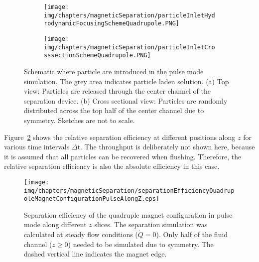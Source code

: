 \begin{figure}[htb]
        \centering
        \begin{subfigure}[b]{0.45\textwidth}
                \texttt{[image: img/chapters/magneticSeparation/particleInletHydrodynamicFocusingSchemeQuadrupole.PNG]}
                \caption{}  
        \end{subfigure}
        \begin{subfigure}[b]{0.45\textwidth}
                \texttt{[image: img/chapters/magneticSeparation/particleInletCrosssectionSchemeQuadrupole.PNG]}
                \caption{}                
        \end{subfigure}
        \caption[Schematic where particle are introduced in the pulse mode simulation]{Schematic where particle are introduced in the pulse mode simulation. The grey area indicates particle laden solution. (a) Top view: Particles are released through the center channel of the separation device. (b) Cross sectional view: Particles are randomly distributed across the top half of the center channel due to symmetry. Sketches are not to scale.}
        \label{fig:particleIntroductionSchemeDoubleMagnetConfigurationQuadrupole}
\end{figure}

Figure~\ref{fig:separationEfficiencyQuadrupoleMagnetConfigurationPulseMode} shows the relative separation efficiency at different positions along $z$ for various time intervals $\Delta\text{t}$. The throughput is deliberately not shown here, because it is assumed that all particles can be recovered when flushing. Therefore, the relative separation efficiency is also the absolute efficiency in this case.

\begin{figure}[htb]
\centering
\texttt{[image: img/chapters/magneticSeparation/separationEfficiencyQuadrupoleMagnetConfigurationPulseAlongZ.eps]}
\caption[Separation efficiency of quadruple magnet configuration in pulse mode]{Separation efficiency of the quadruple magnet configuration in pulse mode along different $z$ slices. The separation simulation was calculated at steady flow conditions ($\dot{Q}=0$). Only half  of the fluid channel ($z \geq 0$) needed to be simulated due to symmetry. The dashed vertical line indicates the magnet edge.}
\label{fig:separationEfficiencyQuadrupoleMagnetConfigurationPulseMode}
\end{figure}

